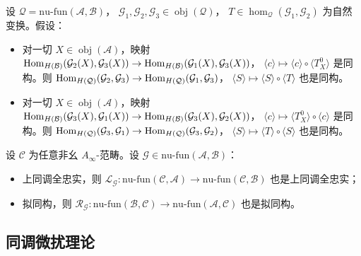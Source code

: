 \begin{Lem}\label{lem:2.15}
设 $\mathcal Q=\mathrm{nu\text{-}fun}(\mathcal A,\mathcal B)$，
$\mathcal G_1,\mathcal G_2,\mathcal G_3\in\operatorname{obj}(\mathcal Q)$，
$T\in\hom_{\mathcal Q}(\mathcal G_1,\mathcal G_2)$ 为自然变换。假设：
\begin{itemize}
  \item 对一切 $X\in\operatorname{obj}(\mathcal A)$，映射
        $\operatorname{Hom}_{H(\mathcal B)}(\mathcal G_2(X),\mathcal G_3(X))\to
        \operatorname{Hom}_{H(\mathcal B)}(\mathcal G_1(X),\mathcal G_3(X))$，
        $\langle c\rangle\mapsto\langle c\rangle\circ\langle T^0_X\rangle$
        是同构。则 $\operatorname{Hom}_{H(\mathcal Q)}(\mathcal G_2,\mathcal G_3)\to
        \operatorname{Hom}_{H(\mathcal Q)}(\mathcal G_1,\mathcal G_3)$，
        $\langle S\rangle\mapsto\langle S\rangle\circ\langle T\rangle$ 也是同构。
  \item 对一切 $X\in\operatorname{obj}(\mathcal A)$，映射
        $\operatorname{Hom}_{H(\mathcal B)}(\mathcal G_3(X),\mathcal G_1(X))\to
        \operatorname{Hom}_{H(\mathcal B)}(\mathcal G_3(X),\mathcal G_2(X))$，
        $\langle c\rangle\mapsto\langle T^0_X\rangle\circ\langle c\rangle$
        是同构。则 $\operatorname{Hom}_{H(\mathcal Q)}(\mathcal G_3,\mathcal G_1)\to
        \operatorname{Hom}_{H(\mathcal Q)}(\mathcal G_3,\mathcal G_2)$，
        $\langle S\rangle\mapsto\langle T\rangle\circ\langle S\rangle$ 也是同构。
\end{itemize}
\end{Lem}

\begin{Lem}\label{lem:2.16}
设 $\mathcal C$ 为任意非幺 $A_\infty$-范畴。设
$\mathcal G\in\mathrm{nu\text{-}fun}(\mathcal A,\mathcal B)$：
\begin{itemize}
  \item 上同调全忠实，则 $\mathcal L_{\mathcal G}:\mathrm{nu\text{-}fun}
        (\mathcal C,\mathcal A)\to\mathrm{nu\text{-}fun}(\mathcal C,\mathcal B)$
        也是上同调全忠实；
  \item 拟同构，则 $\mathcal R_{\mathcal G}:\mathrm{nu\text{-}fun}(\mathcal B,
        \mathcal C)\to\mathrm{nu\text{-}fun}(\mathcal A,\mathcal C)$ 也是拟同构。
\end{itemize}
\end{Lem}

\subsection{同调微扰理论}\label{sec:2.5}

